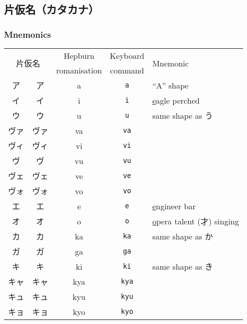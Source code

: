 \documentclass{article}
\begin{document}
\subsection{片仮名（カタカナ）}
\subsubsection{Mnemonics}
\begin{longtable}[c]{@{}ccccl@{}}
    \toprule
    \multicolumn{2}{c}{\multirow{2}{*}{片仮名}} & Hepburn & Keyboard & \multirow{2}{*}{Mnemonic} \\
    \multicolumn{2}{c}{} & romanisation & command & \\* \midrule
    ア & {\sffamily ア} & a & \texttt{a} & ``A'' shape \\
    イ & {\sffamily イ} & i & \texttt{i} & \ul{e}agle perched \\
    ウ & {\sffamily ウ} & u & \texttt{u} & same shape as う \\
    \color{blue} ヴァ & \color{blue} {\sffamily ヴァ} & \color{blue} va & \color{blue} \texttt{va} & \\
    \color{blue} ヴィ & \color{blue} {\sffamily ヴィ} & \color{blue} vi & \color{blue} \texttt{vi} & \\
    \color{blue} ヴ & \color{blue} {\sffamily ヴ} & \color{blue} vu & \color{blue} \texttt{vu} & \\
    \color{blue} ヴェ & \color{blue} {\sffamily ヴェ} & \color{blue} ve & \color{blue} \texttt{ve} & \\
    \color{blue} ヴォ & \color{blue} {\sffamily ヴォ} & \color{blue} vo & \color{blue} \texttt{vo} & \\
    エ & {\sffamily エ} & e & \texttt{e} & \ul{e}ngineer bar \\
    オ & {\sffamily オ} & o & \texttt{o} & \ul{o}pera talent (才) singing \\
    カ & {\sffamily カ} & ka & \texttt{ka} & same shape as か \\
    ガ & {\sffamily ガ} & ga & \texttt{ga} &  \\
    キ & {\sffamily キ} & ki & \texttt{ki} & same shape as き \\
    キャ & {\sffamily キャ} & kya & \texttt{kya} &  \\
    キュ & {\sffamily キュ} & kyu & \texttt{kyu} &  \\
    キョ & {\sffamily キョ} & kyo & \texttt{kyo} &  \\

\end{longtable}
\end{document}

